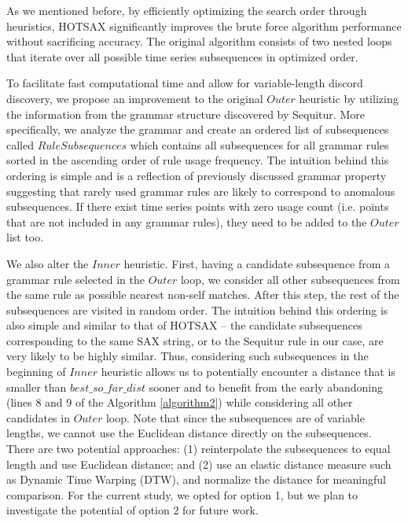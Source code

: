 \documentclass{llncs}
\begin{document}
As we mentioned before, by efficiently optimizing the search order through heuristics, HOTSAX significantly improves the brute force algorithm performance without sacrificing accuracy. The original algorithm consists of two nested loops that iterate over all possible time series subsequences in optimized order. 

To facilitate fast computational time and allow for variable-length discord discovery, we propose an improvement to the original $Outer$ heuristic by utilizing the information from the grammar structure discovered by Sequitur. More specifically, we analyze the grammar and create an ordered list of subsequences called $RuleSubsequences$ which contains all subsequences for all grammar rules sorted in the ascending order of rule usage frequency. The intuition behind this ordering is simple and is a reflection of previously discussed grammar property suggesting that rarely used grammar rules are likely to correspond to anomalous subsequences. If there exist time series points with zero usage count (i.e. points that are not included in any grammar rules), they need to be added to the $Outer$ list too. 

We also alter the $Inner$ heuristic. First, having a candidate subsequence from a grammar rule selected in the $Outer$ loop, we consider all other subsequences from the same rule as possible nearest non-self matches. After this step, the rest of the subsequences are visited in random order. The intuition behind this ordering is also simple and similar to that of HOTSAX -- the 
candidate subsequences corresponding to the same SAX string, or to the Sequitur rule in our case, are very likely to be highly similar. Thus, considering such subsequences in the beginning of $Inner$ heuristic allows us to potentially encounter a distance that is smaller than $best\_so\_far\_dist$ sooner and to benefit from the early abandoning (lines 8 and 9 of the Algorithm \ref{algorithm2}) while considering all other candidates in $Outer$ loop. Note that since the subsequences are of variable lengths, we cannot use the Euclidean distance directly on the subsequences. There are two potential approaches: (1) reinterpolate the subsequences to equal length and use Euclidean distance; and (2) use an elastic distance measure such as Dynamic Time Warping (DTW), and normalize the distance for meaningful comparison. For the current study, we opted for option 1, but we plan to investigate the potential of option 2 for future work. 
\end{document}
